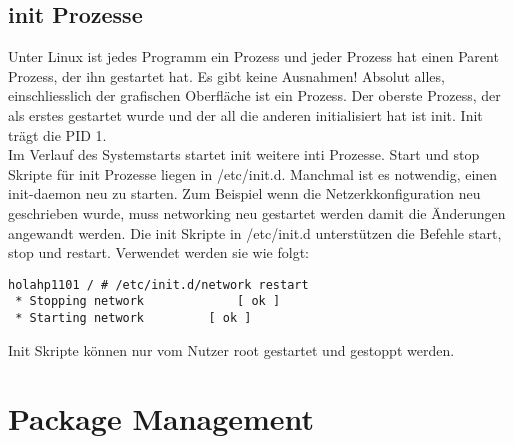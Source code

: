 \documentclass[10pt,paper=a4,final]{scrartcl}
\begin{document}
\subsection{init Prozesse}
Unter Linux ist jedes Programm ein Prozess und jeder Prozess hat einen Parent Prozess, der ihn gestartet hat. Es gibt keine Ausnahmen! Absolut alles, einschliesslich der grafischen Oberfl\"ache ist ein Prozess. Der oberste Prozess, der als erstes gestartet wurde und der all die anderen initialisiert hat ist init. Init tr\"agt die PID 1.\\
Im Verlauf des Systemstarts startet init weitere inti Prozesse. Start und stop Skripte f\"ur init Prozesse liegen in /etc/init.d. Manchmal ist es notwendig, einen init-daemon neu zu starten. Zum Beispiel wenn die Netzerkkonfiguration neu geschrieben wurde, muss networking neu gestartet werden damit die \"Anderungen angewandt werden. Die init Skripte in /etc/init.d unterst\"utzen die Befehle start, stop und restart. Verwendet werden sie wie folgt:
\begin{lstlisting}[frame=single]
holahp1101 / # /etc/init.d/network restart
 * Stopping network             [ ok ]
 * Starting network 	   	[ ok ]
\end{lstlisting}
Init Skripte k\"onnen nur vom Nutzer root gestartet und gestoppt werden.

\section{Package Management}
\end{document}
